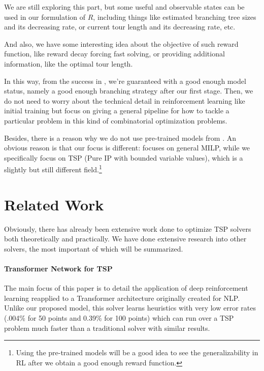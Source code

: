 \documentclass{article}
\begin{document}
We are still exploring this part, but some useful and observable states can be used in our formulation of \(R\), including things like estimated branching tree sizes and its
decreasing rate, or current tour length and its decreasing rate, etc.

And also, we have some interesting idea about the objective of such reward function, like reward decay forcing fast solving, or providing additional information, like the
optimal tour length.

In this way, from the success in \cite{GasseCFCL19}, we're guaranteed with a good enough model status, namely a good enough branching strategy after our first stage. Then, we do not need to worry about the
technical detail in reinforcement learning like initial training but focus on giving a general pipeline for how to tackle a particular problem in this kind of combinatorial optimization problems.

Besides, there is a reason why we do not use pre-trained models from \cite{GasseCFCL19}. An obvious reason is that our focus is different: \cite{GasseCFCL19} focuses on general MILP, while we specifically focus on
TSP (Pure IP with bounded variable values), which is a slightly but still different field.\footnote{Using the pre-trained models will be a good idea to see the generalizability in RL after we obtain a good enough reward function.}

\section{Related Work}
Obviously, there has already been extensive work done to optimize TSP solvers both theoretically and practically. We have done extensive research into other solvers, the most important of which will be summarized.
\paragraph{Transformer Network for TSP \cite{Bresson2021TheTN}}
The main focus of this paper is to detail the application of deep reinforcement learning reapplied to a Transformer architecture originally created for NLP. Unlike our proposed model, this solver learns
heuristics with very low error rates (.004\% for 50 points and 0.39\% for 100 points) which can run over a TSP problem much faster than a traditional solver with similar results.
\end{document}
